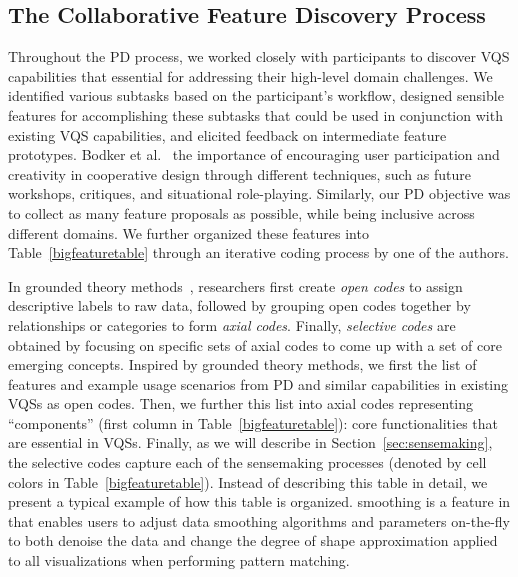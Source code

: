 \subsection{The Collaborative Feature Discovery Process~\label{sec:feature_dsicovery}}
 \par Throughout the PD process, we worked closely with participants to discover VQS capabilities that  essential for addressing their high-level domain challenges. We identified various subtasks based on the participant's workflow, designed sensible features for accomplishing these subtasks that could be used in conjunction with existing VQS capabilities, and elicited feedback on intermediate feature prototypes. Bodker et al.~\cite{BodkerGronbaek}  the importance of encouraging user participation and creativity in cooperative design through different techniques, such as future workshops, critiques, and situational role-playing. Similarly, our PD objective was to collect as many feature proposals as possible, while being inclusive across different domains. We further organized these features into Table~\ref{bigfeaturetable} through an iterative coding process by one of the authors.
 \par In grounded theory methods~\cite{Muller2012}, researchers first create \emph{open codes} to assign descriptive labels to raw data, followed by grouping open codes together by relationships or categories to form \emph{axial codes}. Finally, \emph{selective codes} are obtained by focusing on specific sets of axial codes to come up with a set of core emerging concepts. Inspired by grounded theory methods, we first  the list of features and example usage scenarios from PD and similar capabilities in existing VQSs as open codes. Then, we further  this list into axial codes representing ``components'' (first column in Table~\ref{bigfeaturetable}): core functionalities that are essential in VQSs. Finally, as we will describe in Section~\ref{sec:sensemaking}, the selective codes capture each of the sensemaking processes (denoted by cell colors in Table~\ref{bigfeaturetable}). Instead of describing this table in detail, we present a typical example of how this table is organized.  smoothing is a feature in \zvpp that enables users to adjust data smoothing algorithms and parameters on-the-fly to both denoise the data and change the degree of shape approximation applied to all visualizations when performing pattern matching. %
